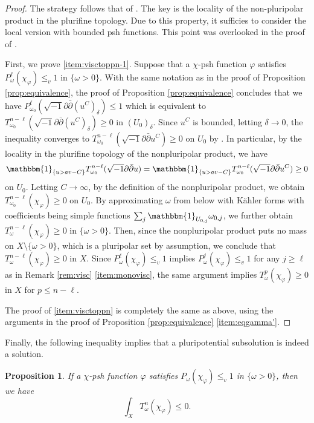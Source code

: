 \documentclass{amsart}
\numberwithin{equation}{section}
\theoremstyle{plain}
\newtheorem{prop}[equation]{Proposition}
\theoremstyle{definition}
\theoremstyle{remark}
\newcommand{\delb}{\sqrt{-1}\partial\bar{\partial}}
\begin{document}
\begin{proof}
    The strategy follows that of \cite[Proposition 1.11, Theorem 1.9, and Corollary 2.6]{EGZ}. The key is the locality of the non-pluripolar product in the plurifine topology. Due to this property, it sufficies to consider the local version with bounded psh functions. This point was overlooked in the proof of \cite[Lemma 2.13]{Mur}.
    
    First, we prove \ref{item:visctoppn-1}. Suppose that a $\chi$-psh function $\varphi$ satisfies $P^\ell_\omega(\chi_\varphi)\le_v 1$ in $\{\omega>0\}$. With the same notation as in the proof of Proposition \ref{prop:equivalence}, the proof of Proposition \ref{prop:equivalence} concludes that we have $P^\ell_{\omega_0}(\delb (u^C)_\delta)\le1$ which is equivalent to $T^{n-\ell}_{\omega_0}(\delb (u^C)_\delta)\ge0$ in $(U_0)_\delta$. Since $u^C$ is bounded, letting $\delta\to0$, the inequality converges to $T^{n-\ell}_{\omega_0}(\delb u^C)\ge0$ on $U_0$ by \cite[Theorem 2.1]{BT}. In particular, by the locality in the plurifine topology of the nonpluripolar product, we have 
    \begin{equation*}
        \mathbbm{1}_{\{u>av-C\}}T_{\omega_0}^{n-\ell}(\delb u)=\mathbbm{1}_{\{u>av-C\}} T^{n-\ell}_{\omega_0}(\delb u^C)\ge0
    \end{equation*}
    on $U_0$. Letting $C\to\infty$, by the definition of the nonpluripolar product, we obtain $T^{n-\ell}_{\omega_0}(\chi_\varphi)\ge0$ on $U_0$.
    By approximating $\omega$ from below with Kähler forms with coefficients being simple functions $\sum_j\mathbbm{1}_{U_{0,j}}\omega_{0,j}$, we further obtain $T^{n-\ell}_\omega(\chi_\varphi)\ge0$ in $\{\omega>0\}$. Then, since the nonpluripolar product puts no mass on $X\setminus
    \{\omega>0\}$, which is a pluripolar set by assumption, we conclude that $T^{n-\ell}_\omega(\chi_\varphi)\ge0$ in $X$. Since $P^\ell_\omega(\chi_\varphi)\le_v1$ implies $P^j_\omega(\chi_\varphi)\le_v1$ for any $j\ge \ell$ as in Remark \ref{rem:visc} \ref{item:monovisc}, the same argument implies $T^p_\omega(\chi_\varphi)\ge0$ in $X$ for $p\le n-\ell$.

    The proof of \ref{item:visctoppn} is completely the same as above, using the arguments in the proof of Proposition \ref{prop:equivalence} \ref{item:eqgamma'}. 
\end{proof}

Finally, the following inequality implies that a pluripotential subsolution is indeed a solution.

\begin{prop}\label{prop:superineq}
    If a $\chi$-psh function $\varphi$ satisfies $P_\omega(\chi_\varphi)\le_v 1$ in $\{\omega>0\}$, then we have
    $$\int_X T^n_\omega(\chi_\varphi)\le0.$$
\end{prop}
\end{document}
